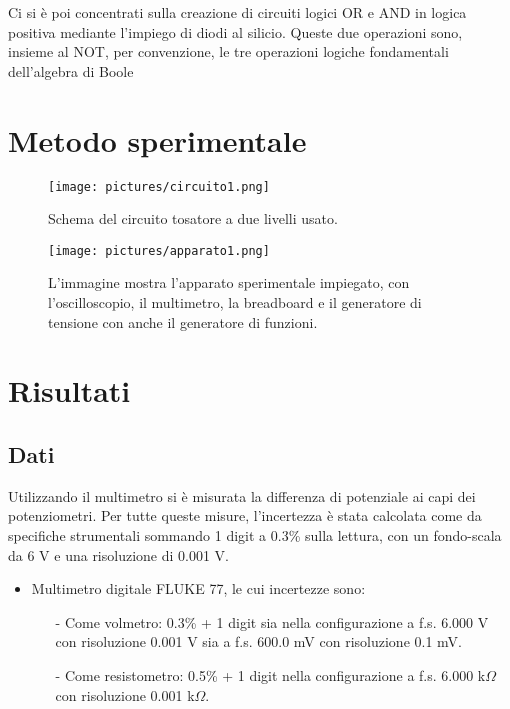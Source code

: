 \documentclass[a4paper,11pt]{article}
\begin{document}
	Ci si è poi concentrati sulla creazione di circuiti logici OR e AND in logica positiva mediante l'impiego di diodi al silicio. Queste due operazioni sono, insieme al NOT, per convenzione, le tre operazioni logiche fondamentali dell'algebra di Boole 
	
	\section{Metodo sperimentale}
	
	
	\begin{figure}
		\centering
		\texttt{[image: pictures/circuito1.png]}
		\caption{Schema del circuito tosatore a due livelli usato.}
		\label{fig:circuito}
	\end{figure}
	
	\begin{figure}
		\centering
		\texttt{[image: pictures/apparato1.png]}
		\caption{L'immagine mostra l'apparato sperimentale impiegato, con l'oscilloscopio, il multimetro, la breadboard e il generatore di tensione con anche il generatore di funzioni. }
		\label{fig:apparato}
	\end{figure}
	
	\FloatBarrier
	\section{Risultati}
	
	
	
	\subsection{Dati}
	Utilizzando il multimetro si è misurata la differenza di potenziale ai capi dei potenziometri. Per tutte queste misure, l'incertezza è stata calcolata come da specifiche strumentali sommando 1 digit a 0.3\% sulla lettura, con un fondo-scala da 6 V e una risoluzione di 0.001 V. 
	
	\begin{itemize}
		\item Multimetro digitale FLUKE 77, le cui incertezze sono:
		\begin{itemize}
			\item[-] Come volmetro: 0.3\% + 1 digit sia nella configurazione a f.s. 6.000 V con risoluzione 0.001 V sia a f.s. 600.0 mV con risoluzione 0.1 mV.
			\item[-] Come resistometro: 0.5\% + 1 digit nella configurazione a f.s. 6.000 k$\Omega$ con risoluzione 0.001 k$\Omega$.
		\end{itemize}
	\end{itemize}
	
\end{document}
